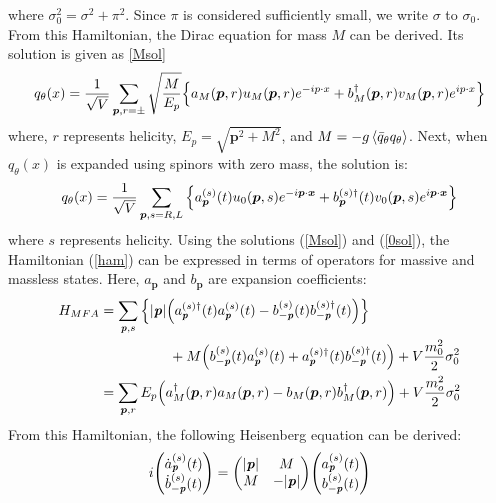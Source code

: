         where $\sigma_0^2 = \sigma^2 + \pi^2$. Since $\pi$ is considered sufficiently small, we write $\sigma$ to $\sigma_0$.  
        From this Hamiltonian, the Dirac equation for mass $M$ can be derived. Its solution is given as \ref{Msol}  
        \begin{eqnarray}
            \label{Msol}
            q_\theta (x)=\frac{1}{\sqrt{V}}\sum_{\bm{p},r=\pm} \sqrt{\frac{M}{E_p}}\qty{a_M(\bm{p},r)u_M(\bm{p},r)e^{-ip\cdot x}+b_M^{\dag}(\bm{p},r)v_M(\bm{p},r)e^{ip\cdot x}}
        \end{eqnarray}
        where, $r$ represents helicity, $E_p = \sqrt{\bm{p}^2 + M^2}$, and $M = -g\ev{\bar{q}_\theta q_\theta}$.  
        Next, when $q_\theta(x)$ is expanded using spinors with zero mass, the solution is:  
        \begin{eqnarray}
            \label{0sol}
            q_\theta (x)=\frac{1}{\sqrt{V}}\sum_{\bm{p},s=R,L}\qty{a_{\bm{p}}^{(s)}(t)u_0(\bm{p},s)e^{-i\bm{p}\cdot \bm{x}}+b_{\bm{p}}^{(s)\dag}(t)v_0(\bm{p},s)e^{i\bm{p}\cdot \bm{x}}}
        \end{eqnarray}
        where $s$ represents helicity.  
        Using the solutions (\ref{Msol}) and (\ref{0sol}), the Hamiltonian (\ref{ham}) can be expressed in terms of operators for massive and massless states. Here, $a_{\bm{p}}$ and $b_{\bm{p}}$ are expansion coefficients:  
        \begin{align}
            \label{hamenzan}
            H_{MFA} &= \sum_{\textbf{\textit{p}},s} 
            \qty{|\textbf{\textit{p}}| 
            \qty(a_{\textbf{\textit{p}}}^{(s)\dag}(t) a_{\textbf{\textit{p}}}^{(s)}(t) 
            - b_{-\textbf{\textit{p}}}^{(s)}(t)b_{-\textbf{\textit{p}}}^{(s)\dag}(t))} \notag \\
            &\hspace{5em} + M \qty(b_{-\textbf{\textit{p}}}^{(s)}(t)a_{\textbf{\textit{p}}}^{(s)}(t) 
            + a_{\textbf{\textit{p}}}^{(s)\dag}(t) b_{-\textbf{\textit{p}}}^{(s)\dag}(t)) 
            + V \frac{m_0^2}{2} \sigma_0^2 \\
            \label{massfinite}
            &= \sum_{\bm{p},r} E_p 
            \qty(a^\dagger_M(\bm{p},r)a_M(\bm{p},r) 
            - b_M(\bm{p},r)b^\dagger_M(\bm{p},r)) 
            + V \frac{m_o^2}{2} \sigma_0^2
        \end{align}
        From this Hamiltonian, the following Heisenberg equation can be derived:  
        \begin{eqnarray}
            \label{massless_Heisenberg_e.q.}
            i \mqty(\dot{a}_{\textbf{\textit{p}}}^{(s)}(t)\\\dot{b}_{-\textbf{\textit{p}}}^{(s)}(t))=\mqty(|\textbf{\textit{p}}|&M\\M&-|\textbf{\textit{p}}|)\mqty(a_{\textbf{\textit{p}}}^{(s)}(t)\\b_{-\textbf{\textit{p}}}^{(s)}(t))
        \end{eqnarray}
